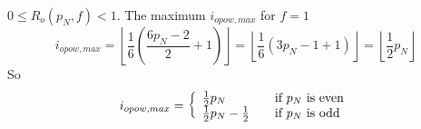 \documentclass{aomart}
\theoremstyle{definition}
\begin{document}
$0 \leq R_{o}(p_{N},f) < 1$. The maximum $i_{opow, max}$ for $f = 1$
\begin{equation}\label{eq:oddpowanykimax}
	i_{opow,max} = \left\lfloor \frac{1}{6} \left( \frac{6p_{N}-2}{2} + 1 \right) \right\rfloor = \left\lfloor \frac{1}{6} \left( 3p_{N} - 1 + 1 \right) \right\rfloor = \left\lfloor \frac{1}{2} p_{N} \right\rfloor
\end{equation}
So
\begin{equation} i_{opow,max} = \left\{
	\begin{array}{l@{\quad \quad}l}
	\frac{1}{2}p_{N} & \textnormal{if $p_{N}$ is even} \\
	\frac{1}{2}p_{N} - \frac{1}{2} & \textnormal{if $p_{N}$ is odd}
	\end{array}
\right. \label{eq:iopowmaxcases} \end{equation} 
\end{document}
